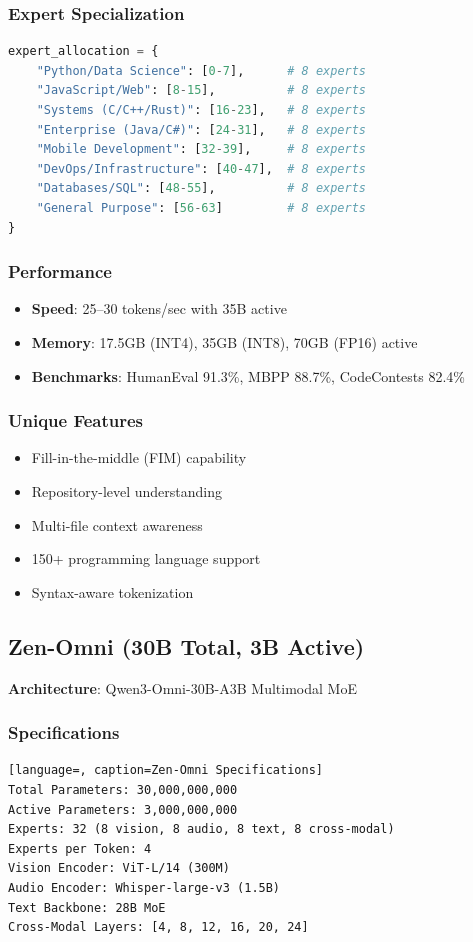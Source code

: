 \documentclass[11pt,a4paper]{article}
\begin{document}
\subsubsection{Expert Specialization}
\begin{lstlisting}[language=Python]
expert_allocation = {
    "Python/Data Science": [0-7],      # 8 experts
    "JavaScript/Web": [8-15],          # 8 experts
    "Systems (C/C++/Rust)": [16-23],   # 8 experts
    "Enterprise (Java/C#)": [24-31],   # 8 experts
    "Mobile Development": [32-39],     # 8 experts
    "DevOps/Infrastructure": [40-47],  # 8 experts
    "Databases/SQL": [48-55],          # 8 experts
    "General Purpose": [56-63]         # 8 experts
}
\end{lstlisting}

\subsubsection{Performance}
\begin{itemize}
    \item \textbf{Speed}: 25--30 tokens/sec with 35B active
    \item \textbf{Memory}: 17.5GB (INT4), 35GB (INT8), 70GB (FP16) active
    \item \textbf{Benchmarks}: HumanEval 91.3\%, MBPP 88.7\%, CodeContests 82.4\%
\end{itemize}

\subsubsection{Unique Features}
\begin{itemize}
    \item Fill-in-the-middle (FIM) capability
    \item Repository-level understanding
    \item Multi-file context awareness
    \item 150+ programming language support
    \item Syntax-aware tokenization
\end{itemize}

\subsection{Zen-Omni (30B Total, 3B Active)}
\textbf{Architecture}: Qwen3-Omni-30B-A3B Multimodal MoE

\subsubsection{Specifications}
\begin{lstlisting}[language=, caption=Zen-Omni Specifications]
Total Parameters: 30,000,000,000
Active Parameters: 3,000,000,000
Experts: 32 (8 vision, 8 audio, 8 text, 8 cross-modal)
Experts per Token: 4
Vision Encoder: ViT-L/14 (300M)
Audio Encoder: Whisper-large-v3 (1.5B)
Text Backbone: 28B MoE
Cross-Modal Layers: [4, 8, 12, 16, 20, 24]
\end{lstlisting}
\end{document}
